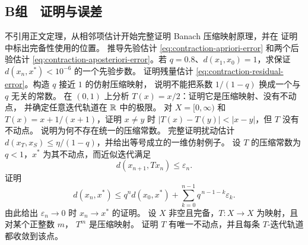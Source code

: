 \subsection*{B组　证明与误差}
\begin{enumerate}[label=\textbf{\thechapter.\arabic*.},resume]
 不引用正文定理，从相邻项估计开始完整证明 Banach 压缩映射原理，并在
 证明中标出完备性使用的位置。
 推导先验估计 \eqref{eq:contraction-apriori-error} 和两个后验估计
 \eqref{eq:contraction-aposteriori-error}。若
 \(q=0.8\)、\(d(x_1,x_0)=1\)，求保证
 \(d(x_n,x^\ast)<10^{-6}\) 的一个先验步数。
 证明残量估计 \eqref{eq:contraction-residual-error}。构造 \(q\) 接近
 \(1\) 的仿射压缩映射，
 说明不能把系数 \(1/(1-q)\) 换成一个与 \(q\) 无关的常数。
 在 \((0,1)\) 上分析 \(T(x)=x/2\)：证明它是压缩映射、没有不动点，
 并确定任意迭代轨道在 \(\mathbb{R}\) 中的极限。
 对 \(X=[0,\infty)\) 和 \(T(x)=x+1/(x+1)\)，证明
 \(x\ne y\) 时 \(|T(x)-T(y)|<|x-y|\)，但 \(T\) 没有不动点。
 说明为何不存在统一的压缩常数。
 完整证明扰动估计
 \(d(x_T,x_S)\le\eta/(1-q)\)，并给出等号成立的一维仿射例子。
 设 \(T\) 的压缩常数为 \(q<1\)，\(x^\ast\) 为其不动点，而近似迭代满足
 \[
  d(x_{n+1},Tx_n)\le\varepsilon_n.
 \]
 证明
 \[
  d(x_n,x^\ast)
  \le q^n d(x_0,x^\ast)
    +\sum_{k=0}^{n-1}q^{\,n-1-k}\varepsilon_k.
 \]
 由此给出 \(\varepsilon_n\to0\) 时 \(x_n\to x^\ast\) 的证明。
 设 \(X\) 非空且完备，\(T:X\to X\) 为映射，且对某个正整数 \(m\)，
 \(T^m\) 是压缩映射。
 证明 \(T\) 有唯一不动点，并且每条 \(T\)-迭代轨道都收敛到该点。
\end{enumerate}


